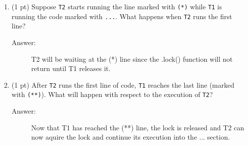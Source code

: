 \documentclass[11pt]{article}
\begin{document}
\begin{enumerate}
\item (1 pt) Suppose \texttt{T2} starts running the line marked with \texttt{(*)} while \texttt{T1} is running
the code marked with \texttt{...}. What happens when \texttt{T2} runs the first line?

\begin{description}
    \item[Answer:] T2 will be waiting at the (*) line since the .lock() function will not return until T1 releases it.
\end{description}

\item (1 pt) After \texttt{T2} runs the first line of code, \texttt{T1} reaches the last line
(marked with \texttt{(**)}). What will happen with respect to the execution of \texttt{T2}?

\begin{description}
    \item[Answer:] Now that T1 has reached the (**) line, the lock is released and T2 can now aquire the lock and continue its execution into the ... section.
\end{description}

\end{enumerate}
\end{document}
